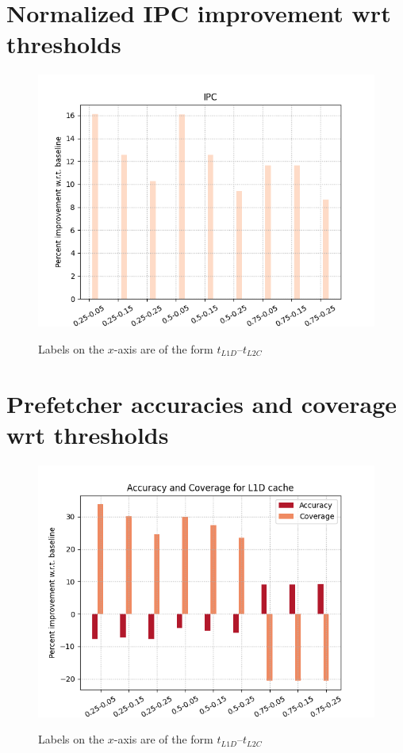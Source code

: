 \documentclass[11pt, swedish, openany]{book}
\begin{document}
\section{Normalized IPC improvement wrt thresholds}
\label{section:ipc}

\begin{figure}[H]
    \centering
    {\includegraphics[scale = 1]{images/combined_ipcs.png}}
    \caption{Labels on the $x$-axis are of the form $t_{L1D}$--$t_{L2C}$}
    \label{fig:ipcs}
\end{figure}

\section{Prefetcher accuracies and coverage wrt thresholds}
\label{section:ac}

\begin{figure}[H]
    \centering
    {\includegraphics[scale = 0.7]{images/combined_L1D.png}}
    \caption{Labels on the $x$-axis are of the form $t_{L1D}$--$t_{L2C}$}
    \label{fig:cl1d}
\end{figure}
\end{document}
